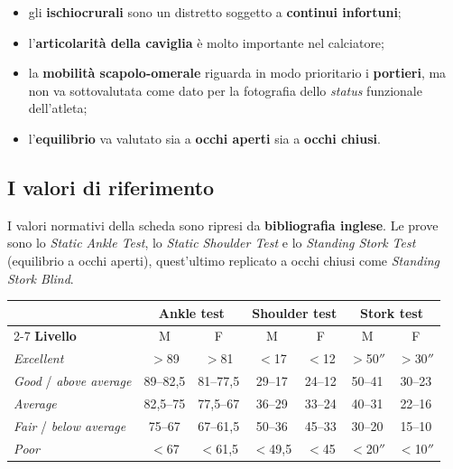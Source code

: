 \begin{itemize}
  \item gli \textbf{ischiocrurali} sono un distretto soggetto a \textbf{continui infortuni};
  \item l'\textbf{articolarità della caviglia} è molto importante nel calciatore;
  \item la \textbf{mobilità scapolo-omerale} riguarda in modo prioritario i \textbf{portieri}, ma
    non va sottovalutata come dato per la fotografia dello \textit{status} funzionale dell'atleta;
  \item l'\textbf{equilibrio} va valutato sia a \textbf{occhi aperti} sia a \textbf{occhi chiusi}.
\end{itemize}

\subsection{I valori di riferimento}

I valori normativi della scheda sono ripresi da \textbf{bibliografia inglese}. Le prove sono lo
\textit{Static Ankle Test}, lo \textit{Static Shoulder Test} e lo \textit{Standing Stork Test}
(equilibrio a occhi aperti), quest'ultimo replicato a occhi chiusi come \textit{Standing Stork
Blind}.

\begin{table}[htbp]
  \centering
  \small
  \renewcommand{\arraystretch}{1.3}
  \begin{tabularx}{\textwidth}{|X|c|c|c|c|c|c|}
    \hline
    & \multicolumn{2}{c|}{\textbf{Ankle test}} & \multicolumn{2}{c|}{\textbf{Shoulder test}} &
      \multicolumn{2}{c|}{\textbf{Stork test}} \\
    \cline{2-7}
    \textbf{Livello} & M & F & M & F & M & F \\
    \hline
    \textit{Excellent} & $>$89 & $>$81 & $<$17 & $<$12 & $>$50$''$ & $>$30$''$ \\
    \hline
    \textit{Good} / \textit{above average} & 89--82,5 & 81--77,5 & 29--17 & 24--12 & 50--41 &
      30--23 \\
    \hline
    \textit{Average} & 82,5--75 & 77,5--67 & 36--29 & 33--24 & 40--31 & 22--16 \\
    \hline
    \textit{Fair} / \textit{below average} & 75--67 & 67--61,5 & 50--36 & 45--33 & 30--20 &
      15--10 \\
    \hline
    \textit{Poor} & $<$67 & $<$61,5 & $<$49,5 & $<$45 & $<$20$''$ & $<$10$''$ \\
    \hline
  \end{tabularx}
\end{table}


